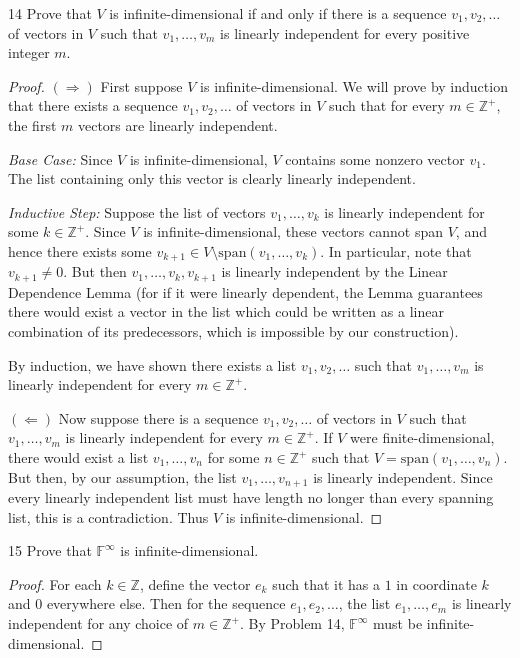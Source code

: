 \documentclass{extarticle}
\newenvironment{problem}[1]{\begin{prob*}{#1}{}}{\end{prob*}}
\newcommand{\Z}{\mathbb{Z}}
\newcommand{\F}{\mathbb{F}}
\newcommand{\Span}{\mathrm{span}}
\begin{document}
\begin{problem}{14}
Prove that $V$ is infinite-dimensional if and only if there is a sequence $v_1,v_2,\dots$ of vectors in $V$ such that $v_1,\dots,v_m$ is linearly independent for every positive integer $m$.
\end{problem}
\begin{proof}
$(\Rightarrow)$ First suppose $V$ is infinite-dimensional.  We will prove by induction that there exists a sequence $v_1,v_2,\dots$ of vectors in $V$ such that for every $m\in\Z^+$, the first $m$ vectors are linearly independent.
\par \emph{Base Case:} Since $V$ is infinite-dimensional, $V$ contains some nonzero vector $v_1$.  The list containing only this vector is clearly linearly independent.
\par \emph{Inductive Step:} Suppose the list of vectors $v_1, \dots, v_k$ is linearly independent for some $k\in\Z^+$.  Since $V$ is infinite-dimensional, these vectors cannot span $V$, and hence there exists some $v_{k+1}\in V\setminus \Span(v_1,\dots, v_k)$.  In particular, note that $v_{k+1}\neq 0$.  But then $v_1,\dots, v_k, v_{k+1}$ is linearly independent by the Linear Dependence Lemma (for if it were linearly dependent, the Lemma guarantees there would exist a vector in the list which could be written as a linear combination of its predecessors, which is impossible by our construction).
\par By induction, we have shown there exists a list $v_1,v_2,\dots$ such that $v_1,\dots,v_m$ is linearly independent for every $m\in\Z^+$.
\par $(\Leftarrow)$ Now suppose there is a sequence  $v_1,v_2,\dots$ of vectors in $V$ such that $v_1,\dots,v_m$ is linearly independent for every $m\in\Z^+$.  If $V$ were finite-dimensional, there would exist a list $v_1,\dots, v_n$ for some $n\in\Z^+$ such that $V=\Span(v_1,\dots,v_n)$.  But then, by our assumption, the list $v_1,\dots,v_{n+1}$ is linearly independent.  Since every linearly independent list must have length no longer than every spanning list, this is a contradiction.  Thus $V$ is infinite-dimensional.
\end{proof}

\begin{problem}{15}
Prove that $\F^\infty$ is infinite-dimensional.
\end{problem}
\begin{proof}
For each $k\in\Z$, define the vector $e_k$ such that it has a $1$ in coordinate $k$ and $0$ everywhere else.  Then for the sequence $e_1,e_2,\dots$, the list $e_1,\dots, e_m$ is linearly independent for any choice of $m\in\Z^+$.  By Problem 14, $\F^\infty$ must be infinite-dimensional.
\end{proof}
\end{document}

